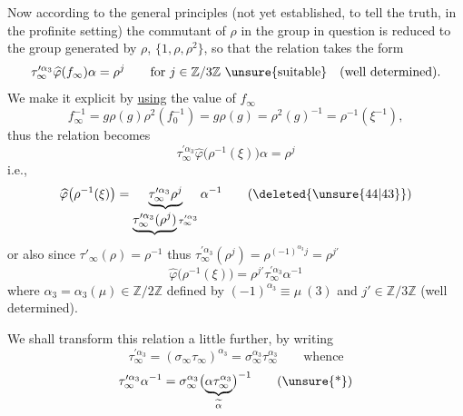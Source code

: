 

Now according to the general principles (not yet established, to tell the truth, in the profinite setting) the commutant of $\rho$ in the group in question is reduced to the group generated by $\rho$, $\{1,\rho,\rho^2\}$, so that the relation \unsure{(*)} takes the form
\[
\tau_\infty^{\prime\alpha_3}\widehat{\varphi}(f_\infty)\alpha=\rho^j
\qquad\text{for }j\in\mathbb Z/3\mathbb Z\ \unsure{\text{suitable}}
\quad\text{(well determined)}.
\]
We make it explicit by \uline{using} the value of $f_\infty$
\[
f_\infty^{-1}=g\rho(g)\rho^2(f_0^{-1})
=g\rho(g)=\rho^2(g)^{-1}=\rho^{-1}(\xi^{-1}),
\]
thus the relation  becomes
\[
\tau_\infty^{\prime\alpha_3}\widehat{\varphi}\bigl(\rho^{-1}(\xi)\bigr)\alpha=\rho^j
\]
i.e., 
\[
\widehat{\varphi}\bigl(\rho^{-1}(\xi)\bigr)
=\underbrace{\tau_\infty^{\prime\alpha_3}\rho^j}_{\underbrace{\tau_\infty^{\prime\alpha_3}(\rho^j)}\tau_\infty^{\prime\alpha_3}}\alpha^{-1}
\tag{\deleted{\unsure{44|43}}}
\]
or also
\deleted{\[
\widehat{\varphi}\bigl(\rho^{-1}(\xi^{-1})\bigr)=\alpha\rho^{-j}\tau_\infty^{\prime\alpha_3}.
\tag{\unsure{44 bis|43 bis}}
\]}
since $\tau'_\infty(\rho)=\rho^{-1}$ thus
$\tau_\infty^{\prime\alpha_3}(\rho^j)=\rho^{(-1)^{\alpha_3}j}=\rho^{j'}$
\[
\widehat{\varphi}\bigl(\rho^{-1}(\xi)\bigr)=\rho^{j'}\tau_\infty^{\prime\alpha_3}\alpha^{-1}
\tag{44}
\]
where $\alpha_3=\alpha_3(\mu)\in\mathbb Z/2\mathbb Z$ defined by $(-1)^{\alpha_3}\equiv\mu\ (3)$ and $j'\in\mathbb Z/3\mathbb Z$ (well determined).

We shall transform this relation a little further, by writing
\[
\tau_\infty^{\prime\alpha_3}=(\sigma_\infty\tau_\infty)^{\alpha_3}=\sigma_\infty^{\alpha_3}\tau_\infty^{\alpha_3}
\qquad\text{whence}
\]
\[
\tau_\infty^{\prime\alpha_3}\alpha^{-1}=\sigma_\infty^{\alpha_3}\bigl(\underbrace{\alpha\tau_\infty^{\alpha_3}}_{\widetilde\alpha}\bigr)^{-1}
\tag{\unsure{*}}
\]



